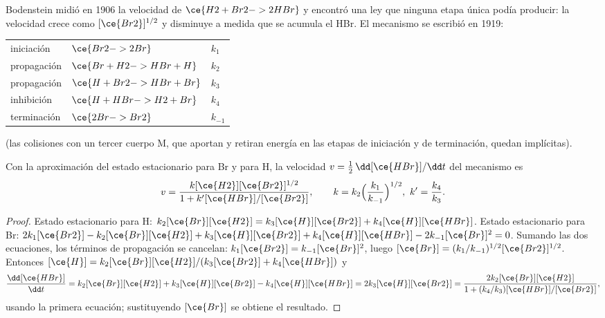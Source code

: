 Bodenstein midió en 1906 la velocidad de $\ce{H2 + Br2 -> 2 HBr}$ y encontró una ley que
ninguna etapa única podía producir: la velocidad crece como $[\ce{Br2}]^{1/2}$ y disminuye a medida que se acumula
el HBr. El mecanismo se escribió en 1919:
\begin{center}
\begin{tabular}{lll}
iniciación & $\ce{Br2 -> 2 Br}$ & $k_1$ \\
propagación & $\ce{Br + H2 -> HBr + H}$ & $k_2$ \\
propagación & $\ce{H + Br2 -> HBr + Br}$ & $k_3$ \\
inhibición & $\ce{H + HBr -> H2 + Br}$ & $k_4$ \\
terminación & $\ce{2 Br -> Br2}$ & $k_{-1}$
\end{tabular}
\end{center}
(las colisiones con un tercer cuerpo M, que aportan y retiran energía en las etapas de
iniciación y de terminación, quedan implícitas).

\begin{theorem}\label{thm:b3:complex-kinetics:hbr}
Con la aproximación del estado estacionario para Br y para H, la velocidad $v = \frac12\,\dd[\ce{HBr}]/\dd t$
del mecanismo es
\[
  v = \frac{k[\ce{H2}][\ce{Br2}]^{1/2}}{1 + k'[\ce{HBr}]/[\ce{Br2}]},
  \qquad k = k_2\Bigl(\frac{k_1}{k_{-1}}\Bigr)^{1/2},\ k' = \frac{k_4}{k_3}.
\]
\end{theorem}

\begin{proof}
Estado estacionario para H: $k_2[\ce{Br}][\ce{H2}] = k_3[\ce{H}][\ce{Br2}] + k_4[\ce{H}][\ce{HBr}]$. Estado estacionario para Br:
$2k_1[\ce{Br2}] - k_2[\ce{Br}][\ce{H2}] + k_3[\ce{H}][\ce{Br2}] + k_4[\ce{H}][\ce{HBr}] - 2k_{-1}[\ce{Br}]^2 = 0$. Sumando las dos
ecuaciones, los términos de propagación se cancelan: $k_1[\ce{Br2}] = k_{-1}[\ce{Br}]^2$, luego $[\ce{Br}] =
(k_1/k_{-1})^{1/2}[\ce{Br2}]^{1/2}$. Entonces $[\ce{H}] = k_2[\ce{Br}][\ce{H2}]/(k_3[\ce{Br2}] + k_4[\ce{HBr}])$ y
\[
  \frac{\dd[\ce{HBr}]}{\dd t} = k_2[\ce{Br}][\ce{H2}] + k_3[\ce{H}][\ce{Br2}] - k_4[\ce{H}][\ce{HBr}] = 2k_3[\ce{H}][\ce{Br2}]
  = \frac{2k_2[\ce{Br}][\ce{H2}]}{1 + (k_4/k_3)[\ce{HBr}]/[\ce{Br2}]},
\]
usando la primera ecuación; sustituyendo $[\ce{Br}]$ se obtiene el resultado.
\end{proof}

